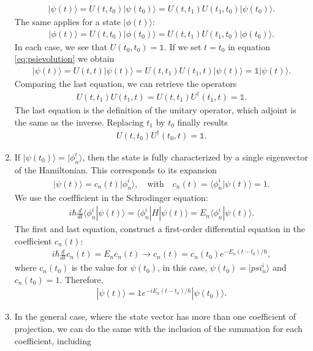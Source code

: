 \documentclass[letterpaper,11pt,twoside]{article}
\newcommand{\ket}[1]{|#1\rangle}
\newcommand{\braket}[1]{\langle#1\rangle}
\begin{document}
\begin{enumerate}[itemsep=0pt,topsep=0pt,label=\alph*)]
\begin{align}
    \ket{\psi(t)}=U(t,t_0)\ket{\psi(t_0)}=U(t,t_1)U(t_1,t_0)\ket{\psi(t_0)}.\label{eq:psievolution}
  \end{align}
  The same applies for a state $\ket{\phi(t)}$:
  \begin{align*}
    \ket{\phi(t)}=U(t,t_0)\ket{\phi(t_0)}=U(t,t_1)U(t_1,t_0)\ket{\phi(t_0)}.
  \end{align*} 
  In each case, we see that $U(t_0,t_0)=\mathds{1}$. If we set $t=t_0$ in equation \eqref{eq:psievolution} we obtain 
  \begin{align*}
    \ket{\psi(t)}=U(t,t)\ket{\psi(t)}=U(t,t_1)U(t_1,t)\ket{\psi(t)}=\mathds{1}\ket{\psi(t)}.
  \end{align*}
  Comparing the last equation, we can retrieve the operators 
  \begin{align*}
    U(t,t_1)U(t_1,t)=U(t,t_1)U^\dagger(t_1,t)=\mathds{1}.
  \end{align*}
  The last equation is the definition of the unitary operator, which adjoint is the same as the inverse. Replacing $t_1$ by $t_0$ finally results 
  \begin{align*}
    U(t,t_0)U^\dagger(t_0,t)=\mathds{1}.
  \end{align*}
  \item If $\ket{\psi(t_0)}=\ket{\phi_n^i}$, then the state is fully characterized by a single eigenvector of the Hamiltonian. This corresponds to its expansion
  \begin{align*}
    \ket{\psi(t)}=c_n(t)\ket{\phi_n^i},\quad\text{with}\quad c_n(t)=\braket{\phi_n^i|\psi(t)}=1.
  \end{align*} 
    We use the coeffficient in the Schrodinger equation:
    \begin{align*}
      i\hbar\frac{d}{dt}\braket{\phi_n^i|\psi(t)}=\braket{\phi_n^i|H|\psi(t)}=E_n\braket{\phi_n^i|\psi(t)}.
    \end{align*}
    The first and last equation, construct a first-order differential equation in the coefficient $c_n(t)$:
    \begin{align*}
      i\hbar\frac{d}{dt}c_n(t)=E_nc_n(t)\longrightarrow c_n(t)=c_n(t_0)e^{-E_n(t-t_0)/\hbar},
    \end{align*}
    where $c_n(t_0)$ is the value for $\psi(t_0)$, in this case, $\psi(t_0)=\ket{psi_n^i}$ and $c_n(t_0)=1$. Therefore,
    \begin{align*}
      \ket{\psi(t)}=1e^{-iE_n(t-t_0)/\hbar}\ket{\psi(t_0)}.
    \end{align*}
  \item In the general case, where the state vector has more than one coefficient of projection, we can do the same with the inclusion of the summation for each coefficient, including 

\end{enumerate}
\end{document}
